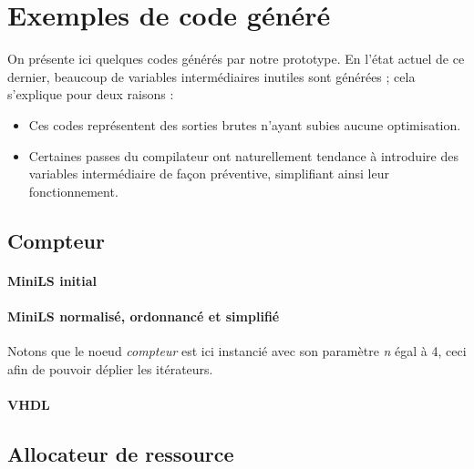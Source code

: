 \documentclass[a4paper]{article}
\begin{document}
\newpage



\newpage
\appendix


\section{Exemples de code g\'en\'er\'e}

On pr\'esente ici quelques codes g\'en\'er\'es par notre prototype. En l'\'etat
actuel de ce dernier, beaucoup de variables interm\'ediaires inutiles sont
g\'en\'er\'ees ; cela s'explique pour deux raisons :

\begin{itemize}
\item Ces codes repr\'esentent des sorties brutes n'ayant subies aucune
  optimisation.
\item Certaines passes du compilateur ont naturellement tendance \`a introduire
  des variables interm\'ediaire de fa\c{c}on pr\'eventive, simplifiant ainsi leur
  fonctionnement.
\end{itemize}

\subsection{Compteur}

\paragraph{MiniLS initial}

\small

\normalsize

\paragraph{MiniLS normalis\'e, ordonnanc\'e et simplifi\'e}

Notons que le noeud \textit{compteur} est ici instanci\'e avec son param\`etre
\textit{n} \'egal \`a 4, ceci afin de pouvoir d\'eplier les it\'erateurs.

\small

\normalsize

\paragraph{VHDL}

\small

\normalsize

\subsection{Allocateur de ressource}
\end{document}
